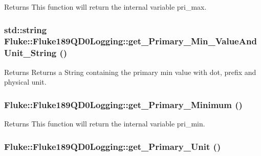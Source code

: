 \label{classFluke_1_1Fluke189QD0Logging_a7da9ac7b5617e427cdfc1b09d6bd4373}
\begin{DoxyReturn}{Returns}
This function will return the internal variable pri\_\-max. 
\end{DoxyReturn}
\hypertarget{classFluke_1_1Fluke189QD0Logging_ab127d5f48ca12170a48cbaacf2b9f96f}{
\subsubsection[{get\_\-Primary\_\-Min\_\-ValueAndUnit\_\-String}]{\setlength{\rightskip}{0pt plus 5cm}std::string Fluke::Fluke189QD0Logging::get\_\-Primary\_\-Min\_\-ValueAndUnit\_\-String ()}}
\label{classFluke_1_1Fluke189QD0Logging_ab127d5f48ca12170a48cbaacf2b9f96f}
\begin{DoxyReturn}{Returns}
Returns a String containing the primary min value with dot, prefix and physical unit. 
\end{DoxyReturn}
\hypertarget{classFluke_1_1Fluke189QD0Logging_a61180ec1e3f4ffc507c5cc92bfa61952}{
\subsubsection[{get\_\-Primary\_\-Minimum}]{ Fluke::Fluke189QD0Logging::get\_\-Primary\_\-Minimum ()}}
\label{classFluke_1_1Fluke189QD0Logging_a61180ec1e3f4ffc507c5cc92bfa61952}
\begin{DoxyReturn}{Returns}
This function will return the internal variable pri\_\-min. 
\end{DoxyReturn}
\hypertarget{classFluke_1_1Fluke189QD0Logging_a864f0f60f6995d5d035163caf0651565}{
\subsubsection[{get\_\-Primary\_\-Unit}]{ Fluke::Fluke189QD0Logging::get\_\-Primary\_\-Unit ()}}
